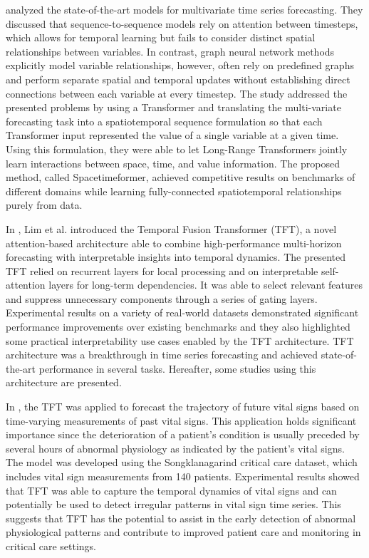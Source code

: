\cite{Grigsby2021} analyzed the state-of-the-art models for multivariate time series forecasting.
They discussed that sequence-to-sequence models rely on attention between timesteps, which allows for temporal learning but fails to consider distinct spatial relationships between variables.
In contrast, graph neural network methods explicitly model variable relationships, however, often rely on predefined graphs and perform separate spatial and temporal updates without establishing direct connections between each variable at every timestep.
The study addressed the presented problems by using a Transformer and translating the multi-variate forecasting task into a spatiotemporal sequence formulation so that each Transformer input represented the value of a single variable at a given time.
Using this formulation, they were able to let Long-Range Transformers jointly learn interactions between space, time, and value information.
The proposed method, called Spacetimeformer, achieved competitive results on benchmarks of different domains while learning fully-connected spatiotemporal relationships purely from data.

In \cite{LIM20211748}, Lim et al. introduced the Temporal Fusion Transformer (TFT), a novel attention-based architecture able to combine high-performance multi-horizon forecasting with interpretable insights into temporal dynamics.
The presented TFT relied on recurrent layers for local processing and on interpretable self-attention layers for long-term dependencies.
It was able to select relevant features and suppress unnecessary components through a series of gating layers.
Experimental results on a variety of real-world datasets demonstrated significant performance improvements over existing benchmarks and they also highlighted some practical interpretability use cases enabled by the TFT architecture.
TFT architecture was a breakthrough in time series forecasting and achieved state-of-the-art performance in several tasks.
Hereafter, some studies using this architecture are presented.

In \cite{9745215}, the TFT was applied to forecast the trajectory of future vital signs based on time-varying measurements of past vital signs.
This application holds significant importance since the deterioration of a patient’s condition is usually preceded by several hours of abnormal physiology as indicated by the patient’s vital signs.
The model was developed using the Songklanagarind critical care dataset, which includes vital sign measurements from 140 patients.
Experimental results showed that TFT was able to capture the temporal dynamics of vital signs and can potentially be used to detect irregular patterns in vital sign time series.
This suggests that TFT has the potential to assist in the early detection of abnormal physiological patterns and contribute to improved patient care and monitoring in critical care settings.

